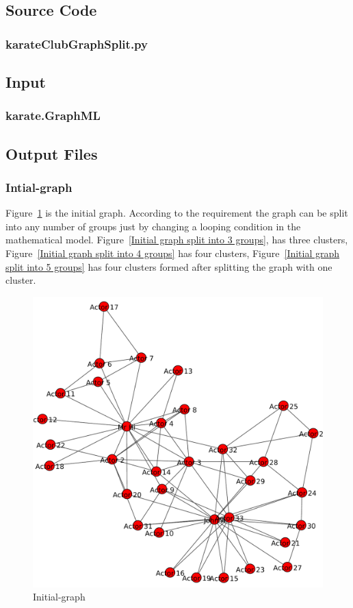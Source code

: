 \documentclass[12pt]{article}
\begin{document}
\subsection{Source Code}
\subsubsection{karateClubGraphSplit.py}

\newpage
\subsection{Input}
\subsubsection{karate.GraphML}

\newpage
\subsection{Output Files}
\subsubsection{Intial-graph}
Figure~\ref{fig:Initial graph} is the initial graph. According to the requirement the graph can be split into any number of groups just by changing a looping condition in the mathematical model.  Figure~\ref{Initial graph split into 3 groups}, has three clusters, Figure~\ref{Initial graph split into 4 groups} has four clusters, Figure~\ref{Initial graph split into 5 groups} has four clusters formed after splitting the graph with  one cluster.
 
\begin{figure}[ht]
\includegraphics[scale=0.7]{../Q2/graph3.pdf}
\centering
\caption{Initial-graph}
\label{fig:Initial graph}
\end{figure}
\newpage
\end{document}
